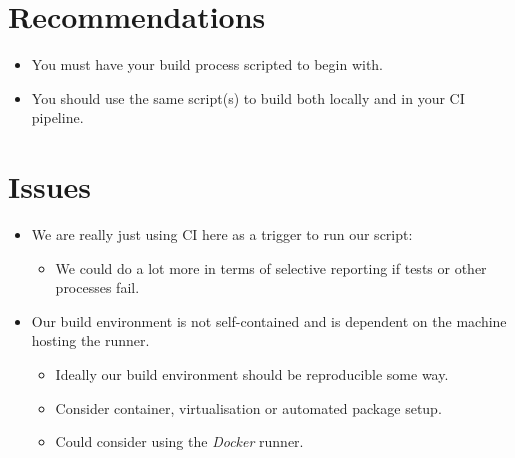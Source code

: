 \documentclass[slides]{pgnotes}
\begin{document}
\section{Recommendations}

\begin{itemize}
\item You must have your build process scripted to begin with.
\item You should use the same script(s) to build both locally and in your CI pipeline.
\end{itemize}

\section{Issues}

\begin{itemize}
\item We are really just using CI here as a trigger to run our script:
  \begin{itemize}
  \item We could do a lot more in terms of selective reporting if tests or other processes fail.
  \end{itemize}
\item Our build environment is not self-contained and is dependent on the machine hosting the runner.
  \begin{itemize}
  \item Ideally our build environment should be reproducible some way.
  \item Consider container, virtualisation or automated package setup.
  \item Could consider using the \textit{Docker} runner.
  \end{itemize}
\end{itemize}
\end{document}
